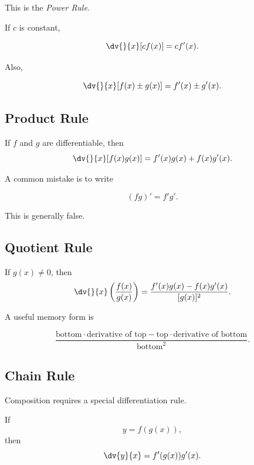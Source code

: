 This is the \emph{Power Rule}.

If \(c\) is constant,

\[ \dv{}{x}[cf(x)]=cf'(x). \]

Also,

\[ \dv{}{x}[f(x)\pm g(x)]
=f'(x)\pm g'(x). \]

\subsection{Product Rule}
\label{subsec:product-rule}

\begin{theorem}
If \(f\) and \(g\) are differentiable, then
\[ \dv{}{x}[f(x)g(x)]
=f'(x)g(x)+f(x)g'(x). \]
\end{theorem}

A common mistake is to write

\[ (fg)'=f'g'. \]

This is generally false.

\subsection{Quotient Rule}
\label{subsec:quotient-rule}

\begin{theorem}
If \(g(x)\neq0\), then
\[ \dv{}{x}\left(\frac{f(x)}{g(x)}\right)
=
\frac{f'(x)g(x)-f(x)g'(x)}{[g(x)]^2}. \]
\end{theorem}

A useful memory form is

\[ \frac{\text{bottom}\cdot\text{derivative of top}
-\text{top}\cdot\text{derivative of bottom}}
{\text{bottom}^2}. \]

\subsection{Chain Rule}
\label{subsec:chain-rule-calculus}

Composition requires a special differentiation rule.

\begin{theorem}
If
\[ y=f(g(x)), \]
then
\[ \dv{y}{x}
=f'(g(x))g'(x). \]
\end{theorem}


